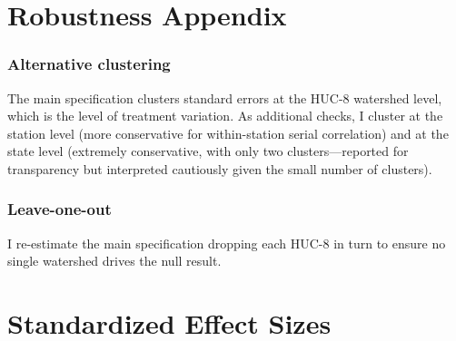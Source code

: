 \documentclass[12pt]{article}
\begin{document}
\section{Robustness Appendix}
\label{app:robust}

\subsubsection*{Alternative clustering} The main specification clusters standard errors at the HUC-8 watershed level, which is the level of treatment variation. As additional checks, I cluster at the station level (more conservative for within-station serial correlation) and at the state level (extremely conservative, with only two clusters---reported for transparency but interpreted cautiously given the small number of clusters).

\subsubsection*{Leave-one-out} I re-estimate the main specification dropping each HUC-8 in turn to ensure no single watershed drives the null result.


\section{Standardized Effect Sizes}
\label{sec:sde}


\end{document}

